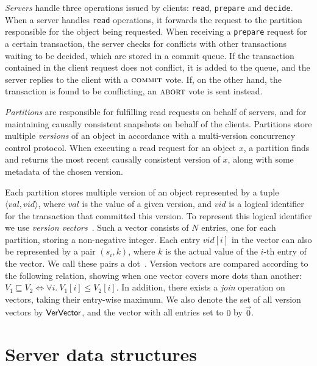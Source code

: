 \emph{Servers} handle three operations issued by clients: \texttt{read}, \texttt{prepare} and \texttt{decide}. When a server handles \texttt{read} operations, it forwards the request to the partition responsible for the object being requested. When receiving a \texttt{prepare} request for a certain transaction, the server checks for conflicts with other transactions waiting to be decided, which are stored in a commit queue. If the transaction contained in the client request does not conflict, it is added to the queue, and the server replies to the client with a $\text{\sc commit}$ vote. If, on the other hand, the transaction is found to be conflicting, an $\text{\sc abort}$ vote is sent instead.

\emph{Partitions} are responsible for fulfilling read requests on behalf of servers, and for maintaining causally consistent snapshots on behalf of the clients. Partitions store multiple \emph{versions} of an object in accordance with a multi-version concurrency control protocol. When executing a read request for an object $x$, a partition finds and returns the most recent causally consistent version of $x$, along with some metadata of the chosen version.

Each partition stores multiple version of an object represented by a tuple $\langle val, vid \rangle$, where $val$ is the value of a given version, and $vid$ is a logical identifier for the transaction that committed this version. To represent this logical identifier we use \emph{version vectors}~\citep{version-vectors}. Such a vector consists of $N$ entries, one for each partition, storing a non-negative integer. Each entry $vid[i]$ in the vector can also be represented by a pair $(s_i, k)$, where $k$ is the actual value of the $i$-th entry of the vector. We call these pairs a dot~\citep{carlos-causality}. Version vectors are compared according to the following relation, showing when one vector covers more dots than another: $V_1 \sqsubseteq V_2 \iff \forall i.\ V_1[i] \le V_2[i]$. In addition, there exists a \emph{join} operation on vectors, taking their entry-wise maximum.
We also denote the set of all version vectors by $\mathsf{VerVector}$, and the vector with all entries set to $0$ by $\vec{0}$.

\section{Server data structures}


